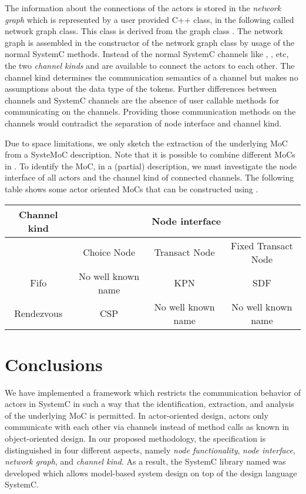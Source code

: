 The information about the connections of the actors is stored
in the \emph{network graph} which is represented by a user provided
C++ class, in the following called network graph class. This class is derived
from the \SysteMoC{} graph class . The network graph is
assembled in the constructor of the network graph class by usage of the normal
SystemC methods. Instead of the normal SystemC channels like
, , etc, the two \SysteMoC{} \emph{channel kinds}
 and  are available
to connect the actors to each other.
The channel kind determines the communication semantics of a channel but
makes no assumptions about the data type of the tokens.
Further differences between \SysteMoC{} channels and SystemC channels are the
absence of user callable methods for communicating on the \SysteMoC{} channels.
Providing those communication methods on the channels would contradict the separation
of node interface and channel kind.

Due to space limitations, we only sketch the extraction of the underlying
MoC from a SysteMoC description. Note that it is possible to combine
different MoCs in \SysteMoC{}. To identify the MoC,
in a (partial) \SysteMoC{} description, we must investigate the
node interface of all actors and the channel kind of connected channels.
The following table shows some actor oriented MoCs that can be constructed using
\SysteMoC.\\[5mm]

\begin{tabular}{|c||c|c|c|}
\hline
 Channel kind & \multicolumn{3}{c|}{ Node interface } \\
\hline
              & Choice Node         & Transact Node      & Fixed Transact Node \\
\hline \hline
 Fifo         & No well known name  & KPN                & SDF \\
\hline
 Rendezvous   & CSP                 & No well known name & No well known name \\
\hline
\end{tabular}

\section{Conclusions}\label{conclusions}

We have implemented a framework which restricts
the communication behavior of actors in SystemC in such a way that the identification,
extraction, and analysis of the underlying MoC is permitted.
In actor-oriented design, actors only
communicate with each other via channels instead of method calls as known
in object-oriented design. In our proposed methodology, the specification is
distinguished in four different aspects,
namely \emph{node functionality}, \emph{node interface}, \emph{network graph}, and
\emph{channel kind}. As a result, the SystemC library named \SysteMoC{}
was developed which allows model-based system design on top of the design language SystemC.

\clearpage
\appendix




